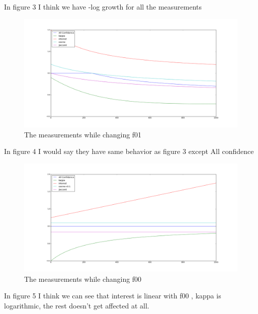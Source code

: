 \documentclass{article}
\begin{document}
In figure 3 I think we have -log growth for all the measurements 
	\begin{figure}[H]
		\includegraphics[scale=0.35]{f01.png}
		\caption{The measurements while changing f01}
	\end{figure}
	In figure 4 I would say they have same behavior as figure 3 except All confidence 
	\begin{figure}[H]
		\includegraphics[scale=0.35]{f00.png}
		\caption{The measurements while changing f00}
	\end{figure}
In figure 5 I think we can see that interest is linear with f00 , kappa is logarithmic, the rest doesn't get affected at all. 
\end{document}
